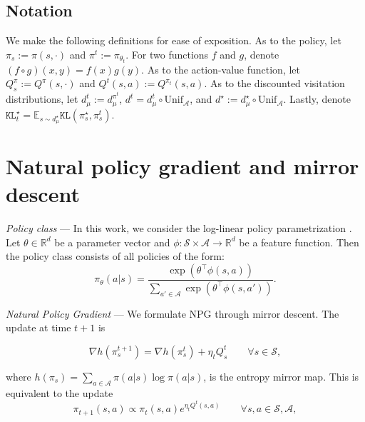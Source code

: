\documentclass[a4paper,12pt]{article}
\newtheorem{assumption}[theorem]{Assumption}
\numberwithin{theorem}{section}
\newcommand\E{\mathbb{E}}
\newcommand\A{\mathcal{A}}
\newcommand\R{\mathbb{R}}
\renewcommand\S{\mathcal{S}}
\newcommand\1{\mathbf{1}}
\newcommand\KL{\mathtt{KL}}
\newcommand{\norm}[1]{\left\lVert #1 \right\rVert}
\begin{document}


\subsection{Notation}
We make the following definitions for ease of exposition. As to the policy, let $\pi_s := \pi(s,\cdot)$ and $\pi^t := \pi_{\theta_t}$. For two functions $f$ and $g$, denote $(f\circ g)(x,y) =f(x)g(y) $. As to the action-value function, let $Q^\pi_s := Q^\pi(s,\cdot)$ and $Q^t(s,a) := Q^{\pi_t}(s,a)$. As to the discounted visitation distributions, let $d^t_\mu := d^{\pi^t}_\mu$, $d^t = d^t_\mu \circ \text{Unif}_\A$, and $d^\star := d^\star_\mu \circ \text{Unif}_\A$. Lastly, denote $\KL^\star_t = \E_{s\sim d^\star_\mu}\KL(\pi^\star_s,\pi^t_s)$.


\section{Natural policy gradient and mirror descent}
\label{sec:algo}
\textit{Policy class} --- In this work, we consider the log-linear policy parametrization \citep{RN265}. Let $\theta\in\R^d$ be a parameter vector and $\phi:\S\times\A\rightarrow\R^d$ be a feature function. Then the policy class consists of all policies of the form:
\[\pi_\theta(a|s) = \frac{\exp(\theta^\top\phi(s,a))}{\sum_{a'\in\A}\exp(\theta^\top\phi(s,a'))}.\]

\textit{Natural Policy Gradient} --- We formulate NPG through mirror descent. The update at time $t+1$ is

\begin{equation}
	\label{eq:update}
	\nabla h(\pi^{t+1}_s) = \nabla h(\pi^t_s) + \eta_t Q^t_s\qquad \forall s\in\S, 
\end{equation}

where $h(\pi_s) = \sum_{a\in\A}\pi(a|s)\log\pi(a|s)$, is the entropy mirror map. This is equivalent to the update
\[\pi_{t+1}(s,a) \propto \pi_t(s,a) e^{\eta_t Q^t(s,a)}\qquad\forall s,a\in\S,\A,\]
\end{document}
